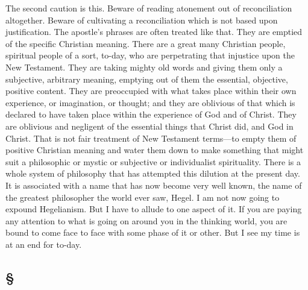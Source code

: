 \documentclass[draft]{ptfdoc}
\begin{document}
The second caution is this. Beware of reading 
atonement out of reconciliation altogether. 
Beware of cultivating a reconciliation which is 
not based upon justification. The apostle's 
phrases are often treated like that. They are 
emptied of the specific Christian meaning. 
There are a great many Christian people, 
spiritual people of a sort, to-day, who are 
perpetrating that injustice upon the New 
Testament. They are taking mighty old words 
and giving them only a subjective, arbitrary 
meaning, emptying out of them the essential, 
objective, positive content. They are preoccupied 
with what takes place within their 
own experience, or imagination, or thought; 
and they are oblivious of that which is 
declared to have taken place within the experience 
of God and of Christ. They are 
oblivious and negligent of the essential things 
that Christ did, and God in Christ. That is 
not fair treatment of New Testament terms---to 
empty them of positive Christian meaning 
and water them down to make something 
that might suit a philosophic or mystic or 
subjective or individualist spirituality. There 
is a whole system of philosophy that has 
attempted this dilution at the present day. It 
is associated with a name that has now become 
very well known, the name of the greatest 
philosopher the world ever saw, Hegel. I am 
not now going to expound Hegelianism. But 
I have to allude to one aspect of it. If you 
are paying any attention to what is going on 
around you in the thinking world, you are 
bound to come face to face with some phase 
of it or other. But I see my time is at an end 
for to-day. 

\subsection*{
\S
}
\end{document}
